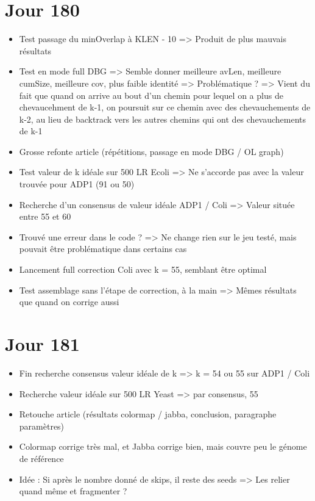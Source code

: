 \documentclass[12pt]{report}
\begin{document}
\section{Jour 180}

\begin{itemize}
	\item Test passage du minOverlap à KLEN - 10 => Produit de plus mauvais résultats
	
	\item Test en mode full DBG => Semble donner meilleure avLen, meilleure cumSize, meilleure cov, plus faible identité
							   => Problématique ?
							   => Vient du fait que quand on arrive au bout d'un chemin pour lequel on a plus de chevaucehment de k-1,
							   	  on poursuit sur ce chemin avec des chevauchements de k-2, au lieu de backtrack vers les autres
							   	  chemins qui ont des chevauchements de k-1

	\item Grosse refonte article (répétitions, passage en mode DBG / OL graph)
	
	\item Test valeur de k idéale sur 500 LR Ecoli => Ne s'accorde pas avec la valeur trouvée pour ADP1 (91 ou 50)
	
	\item Recherche d'un consensus de valeur idéale ADP1 / Coli => Valeur située entre 55 et 60
	
	\item Trouvé une erreur dans le code ? => Ne change rien sur le jeu testé, mais pouvait être problématique dans certains cas
	
	\item Lancement full correction Coli avec k = 55, semblant être optimal
	
	\item Test assemblage sans l'étape de correction, à la main => Mêmes résultats que quand on corrige aussi
\end{itemize}

\section{Jour 181}

\begin{itemize}
	\item Fin recherche consensus valeur idéale de k => k = 54 ou 55 sur ADP1 / Coli
	
	\item Recherche valeur idéale sur 500 LR Yeast => par consensus, 55
	
	\item Retouche article (résultats colormap / jabba, conclusion, paragraphe paramètres)
	
	\item Colormap corrige très mal, et Jabba corrige bien, mais couvre peu le génome de référence
	
	\item Idée : Si après le nombre donné de skips, il reste des seeds => Les relier quand même et fragmenter ?
\end{itemize}
\end{document}
